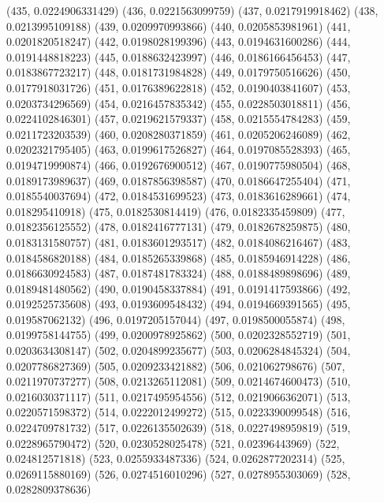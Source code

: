 {					(435, 0.0224906331429)
					(436, 0.0221563099759)
					(437, 0.0217919918462)
					(438, 0.0213995109188)
					(439, 0.0209970993866)
					(440, 0.0205853981961)
					(441, 0.0201820518247)
					(442, 0.0198028199396)
					(443, 0.0194631600286)
					(444, 0.0191448818223)
					(445, 0.0188632423997)
					(446, 0.0186166456453)
					(447, 0.0183867723217)
					(448, 0.0181731984828)
					(449, 0.0179750516626)
					(450, 0.0177918031726)
					(451, 0.0176389622818)
					(452, 0.0190403841607)
					(453, 0.0203734296569)
					(454, 0.0216457835342)
					(455, 0.0228503018811)
					(456, 0.0224102846301)
					(457, 0.0219621579337)
					(458, 0.0215554784283)
					(459, 0.0211723203539)
					(460, 0.0208280371859)
					(461, 0.0205206246089)
					(462, 0.0202321795405)
					(463, 0.0199617526827)
					(464, 0.0197085528393)
					(465, 0.0194719990874)
					(466, 0.0192676900512)
					(467, 0.0190775980504)
					(468, 0.0189173989637)
					(469, 0.0187856398587)
					(470, 0.0186647255404)
					(471, 0.0185540037694)
					(472, 0.0184531699523)
					(473, 0.0183616289661)
					(474, 0.018295410918)
					(475, 0.0182530814419)
					(476, 0.0182335459809)
					(477, 0.0182356125552)
					(478, 0.0182416777131)
					(479, 0.0182678259875)
					(480, 0.0183131580757)
					(481, 0.0183601293517)
					(482, 0.0184086216467)
					(483, 0.0184586820188)
					(484, 0.0185265339868)
					(485, 0.0185946914228)
					(486, 0.0186630924583)
					(487, 0.0187481783324)
					(488, 0.0188489898696)
					(489, 0.0189481480562)
					(490, 0.0190458337884)
					(491, 0.0191417593866)
					(492, 0.0192525735608)
					(493, 0.0193609548432)
					(494, 0.0194669391565)
					(495, 0.019587062132)
					(496, 0.0197205157044)
					(497, 0.0198500055874)
					(498, 0.0199758144755)
					(499, 0.0200978925862)
					(500, 0.0202328552719)
					(501, 0.0203634308147)
					(502, 0.0204899235677)
					(503, 0.0206284845324)
					(504, 0.0207786827369)
					(505, 0.0209233421882)
					(506, 0.021062798676)
					(507, 0.0211970737277)
					(508, 0.0213265112081)
					(509, 0.0214674600473)
					(510, 0.0216030371117)
					(511, 0.0217495954556)
					(512, 0.0219066362071)
					(513, 0.0220571598372)
					(514, 0.0222012499272)
					(515, 0.0223390099548)
					(516, 0.0224709781732)
					(517, 0.0226135502639)
					(518, 0.0227498959819)
					(519, 0.0228965790472)
					(520, 0.0230528025478)
					(521, 0.02396443969)
					(522, 0.024812571818)
					(523, 0.0255933487336)
					(524, 0.0262877202314)
					(525, 0.0269115880169)
					(526, 0.0274516010296)
					(527, 0.0278955303069)
					(528, 0.0282809378636)
}
